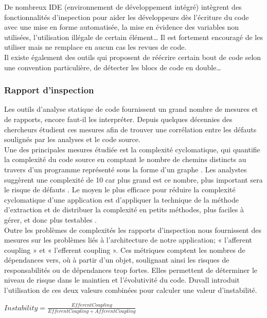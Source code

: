     De nombreux IDE (environnement de développement intégré) intègrent des fonctionnalités d’inspection pour aider les développeurs dès l’écriture du code avec une mise en forme automatisée, la mise en évidence des variables non utilisées, l’utilisation illégale de certain élément… Il est fortement encouragé de les utiliser mais ne remplace en aucun cas les revues de code.\\

    Il existe également des outils qui proposent de réécrire certain bout de code selon une convention particulière, de détecter les blocs de code en double…

      \subsubsection{Rapport d’inspection}
      Les outils d’analyse statique de code fournissent un grand nombre de mesures et de rapports, encore faut-il les interpréter. Depuis quelques décennies des chercheurs étudient ces mesures afin de trouver une corrélation entre les défauts soulignés par les analyses et le code source.\\

      Une des principales mesures étudiée est la complexité cyclomatique, qui quantifie la complexité du code source en comptant le nombre de chemins distincts au travers d'un programme représenté sous la forme d'un graphe \cite{Kan03}. Les analystes suggèrent une complexité de 10 car plus grand est ce nombre, plus important sera le risque de défauts \cite{Wat96}. Le moyen le plus efficace pour réduire la complexité cyclomatique d’une application est d'appliquer la technique de la méthode d'extraction et de distribuer la complexité en petits méthodes, plus faciles à gérer, et donc plus testables \cite{Duv07}.\\

      Outre les problèmes de complexités les rapports d’inspection nous fournissent des mesures sur les problèmes liés à l’architecture de notre application; « l’afferent coupling » et « l’efferent coupling ». Ces métriques comptent les nombres de dépendances vers, où à partir d’un objet, soulignant ainsi les risques de responsabilités ou de dépendances trop fortes. Elles permettent de déterminer le niveau de risque dans le maintien et l’évolutivité du code. Duvall introduit l'utilisation de ces deux valeurs combinées pour calculer une valeur d'instabilité.\\

      \begin{center}
          $Instability=\frac{EfferentCoupling}{EfferentCoupling + AfferentCoupling}$\\
      \end{center}

